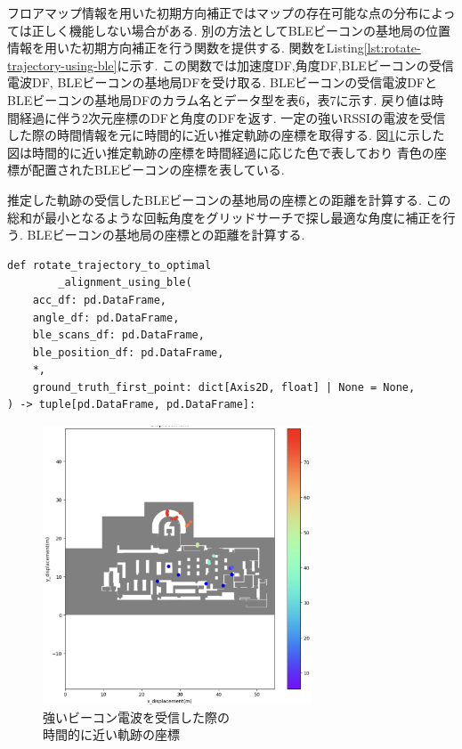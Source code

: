 
フロアマップ情報を用いた初期方向補正ではマップの存在可能な点の分布によっては正しく機能しない場合がある.
別の方法としてBLEビーコンの基地局の位置情報を用いた初期方向補正を行う関数を提供する.
関数をListing\ref{lst:rotate-trajectory-using-ble}に示す.
この関数では加速度DF,角度DF,BLEビーコンの受信電波DF, BLEビーコンの基地局DFを受け取る.
BLEビーコンの受信電波DFとBLEビーコンの基地局DFのカラム名とデータ型を表6，表7に示す.
戻り値は時間経過に伴う2次元座標のDFと角度のDFを返す.
一定の強いRSSIの電波を受信した際の時間情報を元に時間的に近い推定軌跡の座標を取得する.
図\ref{fig:ble-merge}に示した図は時間的に近い推定軌跡の座標を時間経過に応じた色で表しており
青色の座標が配置されたBLEビーコンの座標を表している.

推定した軌跡の受信したBLEビーコンの基地局の座標との距離を計算する.
この総和が最小となるような回転角度をグリッドサーチで探し最適な角度に補正を行う.
BLEビーコンの基地局の座標との距離を計算する.

\begin{lstlisting}[caption={BLEビーコンの基地局の位置情報を使用した初期方向補正}, label=lst:rotate-trajectory-using-ble]
def rotate_trajectory_to_optimal
		_alignment_using_ble(
    acc_df: pd.DataFrame,
    angle_df: pd.DataFrame,
    ble_scans_df: pd.DataFrame,
    ble_position_df: pd.DataFrame,
    *,
    ground_truth_first_point: dict[Axis2D, float] | None = None,
) -> tuple[pd.DataFrame, pd.DataFrame]:
\end{lstlisting}


\begin{figure}[ht]
	\centering
	\includegraphics[width=80mm]{image/ble-merge.jpg}
	\caption{強いビーコン電波を受信した際の\\時間的に近い軌跡の座標}    \label{fig:ble-merge}
\end{figure}

